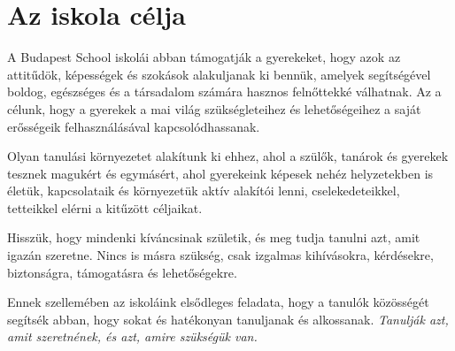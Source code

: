 \section{Az iskola célja}
\label{sec:iskola_celja}

A Budapest School iskolái abban támogatják a gyerekeket, hogy azok az attitűdök, képességek és szokások alakuljanak ki bennük, amelyek segítségével boldog, egészséges és a társadalom számára hasznos felnőttekké válhatnak. Az a célunk, hogy a gyerekek a mai világ szükségleteihez és lehetőségeihez a saját erősségeik felhasználásával kapcsolódhassanak.

Olyan tanulási környezetet alakítunk ki ehhez, ahol a szülők, tanárok és gyerekek tesznek magukért és egymásért, ahol gyerekeink képesek nehéz helyzetekben is életük, kapcsolataik és környezetük aktív alakítói lenni, cselekedeteikkel, tetteikkel elérni a kitűzött céljaikat.

Hisszük, hogy mindenki kíváncsinak születik, és meg tudja tanulni azt, amit igazán szeretne. Nincs is másra szükség, csak izgalmas kihívásokra, kérdésekre, biztonságra, támogatásra és lehetőségekre.

Ennek szellemében az iskoláink elsődleges feladata, hogy a tanulók közösségét segítsék abban, hogy sokat és hatékonyan tanuljanak és alkossanak. \emph{Tanulják azt, amit szeretnének, és azt, amire szükségük van.}
